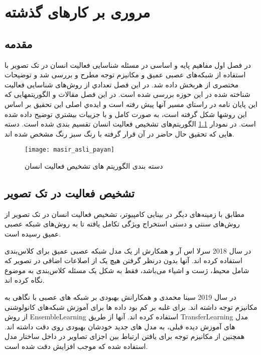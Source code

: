 \chapter{مروری بر کارهای گذشته}

\section{مقدمه}
در فصل اول مفاهیم پایه و اساسی در مسئله شناسایی فعالیت انسان در تک تصویر با استفاده از شبکه‌های عصبی عمیق و مکانیزم توجه مطرح و بررسی شد و توضیحات مختصری از هربخش داده شد. در این فصل تعدادي
از روش‌های شناسایی فعالیت شناخته شده در این حوزه بررسی شده است. در این فصل مقالات و
الگوریتمهایی که این پایان نامه در راستاي مسیر آنها پیش رفته است و ایده‌ي اصلی این تحقیق بر اساس این
روشها شكل گرفته است، به صورت کامل و با جزییات بیشتري توضیح داده شده است.
در نمودار %
\ref{fig:masir_asli_payan}
 الگوریتم‌های تشخیص فعالیت انسان تقسیم بندی شده است. دسته هایی که تحقیق حال حاضر در آن قرار گرفته با رنگ سبز رنگ مشخص شده اند.
\vspace{8pt}
\begin{figure}[ht]
	\centerline{\texttt{[image: masir\_asli\_payan]}}
	\caption{دسته بندی الگوریتم های تشخیص فعالیت انسان}
	\label{fig:masir_asli_payan}
\end{figure}

\section{تشخیص فعالیت  در تک تصویر}
مطابق با زمینه‌های دیگر در بینایی کامپیوتر، تشخیص فعالیت انسان در تک تصویر از روش‌های سنتی و دستی استخراج ویژگی تکامل یافته تا به روش‌های شبکه عصبی عمیق رسیده است.

در سال 2018 سرلا اس آر و همکارش %
\cite{ActionRec_using_Res_network}
از یک مدل شبکه عصبی عمیق برای کلاس‌‌بندی استفاده کرده اند. آنها بدون درنظر گرفتن هیچ یک از اصلاعات اضافی در تصویر که شامل محیط،‌ ژست و اشیاء می‌باشد، فقط به شکل یک مسئله کلاس‌بندی به موضوع نگاه کرده اند.

در سال 2019 سینا محمدی و همکارانش %
\cite{Ensemble_deep_neu_action_still}
 بهبودی بر شبکه های عصبی با نگاهی به مکانیزم توجه داشته اند. برای غلبه بر کم بود داده ها برای آموزش شبکه‌های کانولوشنی از روش %
\gls{EnsembleLearning}
  استفاده کرده اند. آنها از طریق %
\gls{TransferLearning}
مدل های آموزش دیده قبلی، به مدل های جدید خودشان بهبودی روی دقت داشته اند. همچنین از مکانیزم توجه برای یافتن ارتباط بین اجزای تصاویر در داخل ساختار مدل استفاده شده که موجب افزایش دقت شده است.
 
